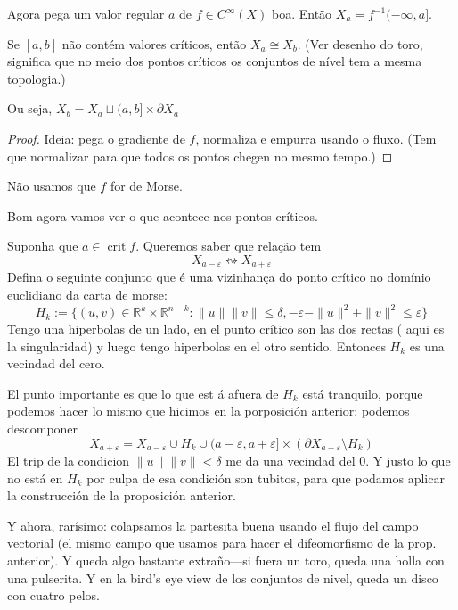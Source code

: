 Agora pega um valor regular \(a\) de \(f \in C^\infty(X)\) boa. Então \(X_a=f^{-1}(-\infty,a]\).


\begin{prop}\leavevmode
	Se \([a,b]\) não contém valores críticos, então  \(X_a \cong X_b\). (Ver desenho do toro, significa que no meio dos pontos críticos os conjuntos de nível tem a mesma topologia.)

	Ou seja, \(X_b= X_a \sqcup (a,b] \times \partial X_a\)
\end{prop}

\begin{proof}\leavevmode
Ideia: pega o gradiente de \(f\), normaliza e empurra usando o fluxo. (Tem que normalizar para que todos os pontos chegen no mesmo tempo.)
\end{proof}

\begin{remark}\leavevmode
Não usamos que \(f\) for de Morse.
\end{remark}

Bom agora vamos ver o que acontece nos pontos críticos.

Suponha que \(a \in \operatorname{crit} f\). Queremos saber que relação tem
\[X_{a-\varepsilon} \leftrightsquigarrow X_{a+\varepsilon}\]
Defina o seguinte conjunto que é uma vizinhança do ponto crítico no domínio euclidiano da carta de morse:
\[H_k:=\{(u,v) \in \mathbb{R}^k \times \mathbb{R}^{ n-k}: \|u\|\|v\|\leq  \delta, -\varepsilon -\|u\|^2 + \|v\|^2 \leq  \varepsilon\}\]
Tengo una hiperbolas de un lado, en el punto crítico son las dos rectas ( aqui es la singularidad) y luego tengo hiperbolas en el otro sentido. Entonces \(H_k\) es una vecindad del cero.

El punto importante es que lo que est á afuera de \(H_k\) está tranquilo, porque podemos hacer lo mismo que hicimos en la porposición anterior: podemos descomponer
\[X_{a+ \varepsilon}= X_{a- \varepsilon} \cup  H_k \cup  (a - \varepsilon, a+\varepsilon]\times(\partial X_{a-\varepsilon}\setminus H_k)\]
El trip de la condicion \(\|u\|\|v\|<\delta\) me da una vecindad del 0. Y justo lo que no está en \(H_k\) por culpa de esa condición son tubitos, para que podamos aplicar la construcción de la proposición anterior.

Y ahora, rarísimo: colapsamos la partesita buena usando el flujo del campo vectorial (el mismo campo que usamos para hacer el difeomorfismo de la prop. anterior). Y queda algo bastante extraño---si fuera un toro, queda una holla con una pulserita. Y en la bird's eye view de los conjuntos de nivel, queda un disco con cuatro pelos.

